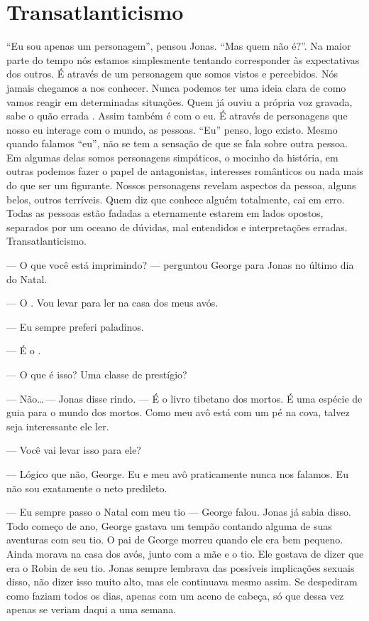 \chapter{Transatlanticismo}

``Eu sou apenas um personagem'', pensou Jonas. ``Mas quem não é?''. Na maior parte do tempo nós estamos simplesmente tentando corresponder às expectativas dos outros. É através de um personagem que somos vistos e percebidos. Nós jamais chegamos a nos conhecer. Nunca podemos ter uma ideia clara de como vamos reagir em determinadas situações. Quem já ouviu a própria voz gravada, sabe o quão errada . Assim também é com o eu. É através de personagens que nosso eu interage com o mundo,  as pessoas. ``Eu'' penso, logo existo. Mesmo quando falamos ``eu'', não se tem a sensação de que se fala sobre outra pessoa. Em algumas delas somos personagens simpáticos, o mocinho da história, em outras podemos fazer o papel de antagonistas, interesses românticos ou nada mais do que ser um figurante. Nossos personagens revelam aspectos da pessoa, alguns belos, outros terríveis. Quem diz que conhece alguém totalmente, cai em erro. Todas as pessoas estão fadadas a eternamente estarem em lados opostos, separados por um oceano de dúvidas, mal entendidos e interpretações erradas. Transatlanticismo.

--- O que você está imprimindo? --- perguntou George para Jonas\mudanca{,} no último dia do Natal.

--- O . Vou levar para ler na casa dos meus avós.

--- Eu sempre preferi paladinos.

--- É o .

--- O que é isso? Uma classe de prestígio?

--- Não\ldots\,--- Jonas disse\mudanca{,} rindo. --- É o livro tibetano dos mortos. É uma espécie de guia para o mundo dos mortos. Como meu avô está com um pé na cova, talvez seja interessante ele ler.

--- Você vai levar isso para ele?

--- Lógico que não, George. Eu e meu avô praticamente nunca nos falamos. Eu não sou exatamente o neto predileto.

--- Eu sempre passo o Natal com meu tio --- George falou. Jonas já sabia disso. Todo começo de ano, George gastava um tempão contando alguma de suas aventuras com seu tio. O pai de George morreu quando ele era bem pequeno. Ainda morava na casa dos avós, junto com a mãe e o tio. Ele gostava de dizer que era o Robin de seu tio. Jonas sempre lembrava das possíveis implicações sexuais disso,  não dizer isso muito alto, mas ele continuava mesmo assim. Se despediram como faziam todos os dias, apenas com um aceno de cabeça, só que dessa vez apenas se veriam daqui a uma semana.

